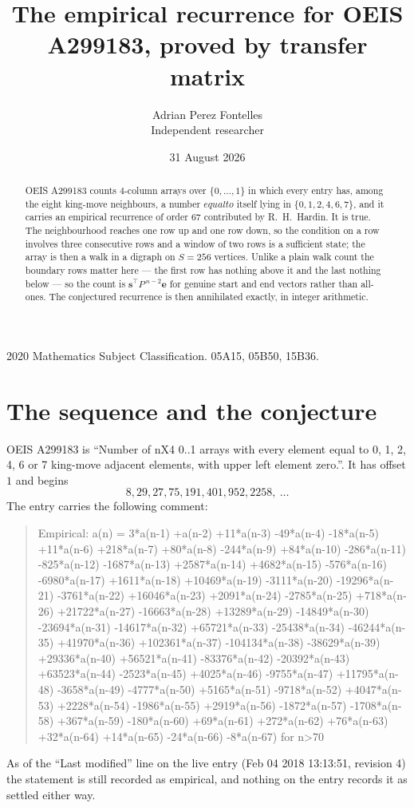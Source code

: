\documentclass[11pt,a4paper]{article}
\title{The empirical recurrence for OEIS A299183, proved by transfer matrix}
\author{Adrian Perez Fontelles\\ \small Independent researcher}
\date{31 August 2026}
\theoremstyle{plain}
\theoremstyle{definition}
\begin{document}
\maketitle

\begin{abstract}
OEIS A299183 counts $4$-column arrays over $\{0,\dots,1\}$ in which every entry has,
among the eight king-move neighbours, a number $equal to$ itself lying in $\{0,1,2,4,6,7\}$, and it carries an empirical
recurrence of order $67$ contributed by R.~H.~Hardin. It is true. The neighbourhood
reaches one row up and one row down, so the condition on a row involves three consecutive
rows and a window of two rows is a sufficient state; the array is then a walk in a digraph
on $S=256$ vertices. Unlike a plain walk count the boundary rows matter here --- the first
row has nothing above it and the last nothing below --- so the count is
$\mathbf{s}^{\!\top}P^{\,n-2}\mathbf{e}$ for genuine start and end vectors rather than
all-ones. The conjectured recurrence is then annihilated exactly, in integer arithmetic.
\end{abstract}

\noindent\small 2020 Mathematics Subject Classification. 05A15, 05B50, 15B36.\normalsize

\section{The sequence and the conjecture}

OEIS A299183 is ``Number of nX4 0..1 arrays with every element equal to 0, 1, 2, 4, 6 or 7 king-move adjacent elements, with upper left element zero.''. It has offset
$1$ and begins
\[
8, 29, 27, 75, 191, 401, 952, 2258,\ \dots
\]
The entry carries the following comment:
\begin{quote}\small
Empirical: a(n) = 3*a(n-1) +a(n-2) +11*a(n-3) -49*a(n-4) -18*a(n-5) +11*a(n-6) +218*a(n-7) +80*a(n-8) -244*a(n-9) +84*a(n-10) -286*a(n-11) -825*a(n-12) -1687*a(n-13) +2587*a(n-14) +4682*a(n-15) -576*a(n-16) -6980*a(n-17) +1611*a(n-18) +10469*a(n-19) -3111*a(n-20) -19296*a(n-21) -3761*a(n-22) +16046*a(n-23) +2091*a(n-24) -2785*a(n-25) +718*a(n-26) +21722*a(n-27) -16663*a(n-28) +13289*a(n-29) -14849*a(n-30) -23694*a(n-31) -14617*a(n-32) +65721*a(n-33) -25438*a(n-34) -46244*a(n-35) +41970*a(n-36) +102361*a(n-37) -104134*a(n-38) -38629*a(n-39) +29336*a(n-40) +56521*a(n-41) -83376*a(n-42) -20392*a(n-43) +63523*a(n-44) -2523*a(n-45) +4025*a(n-46) -9755*a(n-47) +11795*a(n-48) -3658*a(n-49) -4777*a(n-50) +5165*a(n-51) -9718*a(n-52) +4047*a(n-53) +2228*a(n-54) -1986*a(n-55) +2919*a(n-56) -1872*a(n-57) -1708*a(n-58) +367*a(n-59) -180*a(n-60) +69*a(n-61) +272*a(n-62) +76*a(n-63) +32*a(n-64) +14*a(n-65) -24*a(n-66) -8*a(n-67) for n>70
\end{quote}
As of the ``Last modified'' line on the live entry (Feb 04 2018 13:13:51, revision
4) the statement is still recorded as empirical, and nothing on the entry
records it as settled either way.
\end{document}
